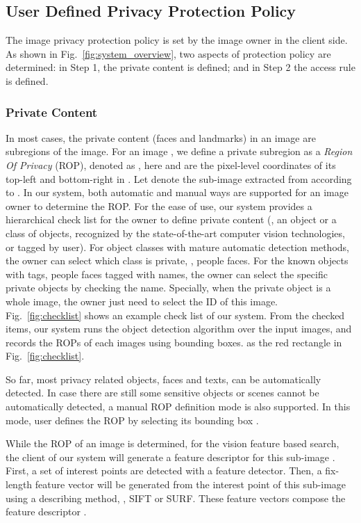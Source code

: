 {\subsection{User Defined Privacy Protection Policy}
The image privacy protection policy is set by the image owner in the client side.
As shown in Fig.~\ref{fig:system_overview},
 two aspects of protection policy are determined:
 in Step {\large{\textcircled{\small{1}}}}, the private content is defined;
 and in Step {\large{\textcircled{\small{2}}}} the access rule is defined.

\subsubsection{Private Content}
In most cases,
 the private content (\eg faces and landmarks) in an image are subregions of the image.
For an image ,
 we define a private subregion as a \emph{Region Of Privacy} (ROP), denoted as ,
 here  and   are the pixel-level coordinates of its top-left and bottom-right in .
Let  denote the sub-image extracted from  according to .
In our system,
 both automatic and manual ways are supported for an image owner to
 determine the ROP.
For the ease of use,
 our system provides a hierarchical check list for the owner to define
 private content (\eg, an object or a class of objects, recognized by
 the state-of-the-art computer vision technologies, or tagged by user).
For object classes with mature automatic detection methods,
 the owner can select which class is private, \eg, people faces.
For the known objects with tags, \eg people faces tagged with names,
  the owner can select the specific private objects by checking the name.
Specially, when the private object is a whole image,
 the owner just need to select the ID of this image.
Fig.~\ref{fig:checklist} shows an example check list of our system.
From the checked items,
 our system runs the object detection algorithm over the input images,
 and records the ROPs of each images using  bounding boxes.
as the red rectangle in Fig.~\ref{fig:checklist}.

So far, most privacy related objects,
 \eg faces and texts, can be automatically detected.
In case  there are still some sensitive objects or scenes
 cannot be automatically detected,
 a manual ROP definition mode is also supported.
In this mode,
 user defines the ROP  by selecting its bounding box .

While the ROP  of an image  is determined,
 for the vision feature based search,
 the client of our system will generate a feature descriptor  for
 this sub-image .
First, a set of interest points 
 are detected with a feature detector.
Then, a fix-length feature vector  will be generated from
 the interest point  of this sub-image using a describing method, \eg, SIFT \cite{lowe2004distinctive} or SURF.
These feature vectors compose the feature descriptor .




}
